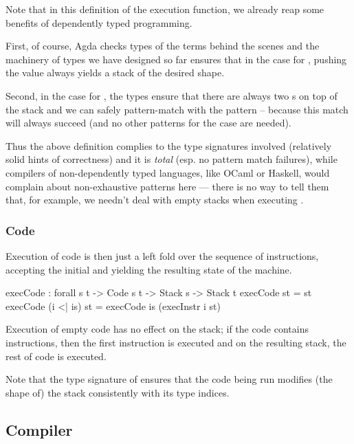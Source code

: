 Note that in this definition of the execution function, we already reap some
benefits of dependently typed programming.

First, of course, Agda checks types of the terms behind
the scenes and the machinery of types we have designed so far ensures that
in the case for , pushing the value  always yields
a stack of the desired shape.

Second, in the case for , the types ensure that there are always two
s on top of the stack and we can safely pattern-match with the
pattern  \scons {} \scons {} -- because this match
will always succeed (and no other patterns for the  case are needed). 

Thus the above definition complies to the type signatures involved (relatively
solid hints of correctness) and it is \emph{total} (esp. no pattern match failures),
while compilers of non-dependently typed languages, like OCaml or Haskell,
would complain about non-exhaustive patterns here --- there is no way to tell them
that, for example, we needn't deal with empty stacks when executing .


\subsubsection{Code}

Execution of code is then just a left fold over the sequence of instructions,
accepting the initial and yielding the resulting state of the machine.

\begin{code}
  execCode : forall {s t} -> Code s t -> Stack s -> Stack t
  execCode \nil st = st
  execCode (i <| is) st = execCode is (execInstr i st)
\end{code}

\noindent Execution of empty code has no effect on the stack; if the code
contains instructions, then the first instruction is executed and on the
resulting stack, the rest of code is executed.

Note that the type signature of  ensures that the code being
run modifies (the shape of) the stack consistently with its type indices.

\subsection{Compiler}

